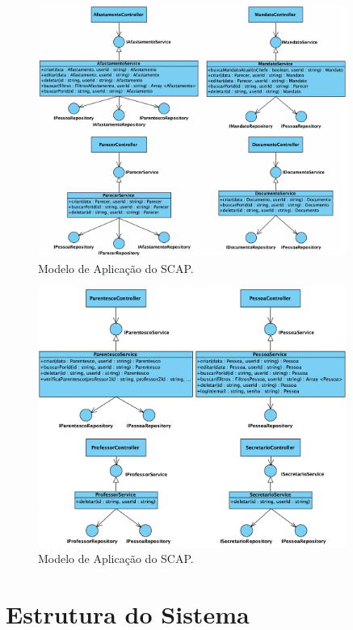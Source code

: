 \begin{figure}[h!]
    \centering
    \includegraphics[width=0.9\textwidth]{figuras/fig-modelo-apl-1.png}
    \caption{Modelo de Aplicação do SCAP.}
    \label{fig-modelo-aplicacao-1}
\end{figure}


\begin{figure}[h!]
    \centering
    \includegraphics[width=0.9\textwidth]{figuras/fig-modelo-apl-2.png}
    \caption{Modelo de Aplicação do SCAP.}
    \label{fig-modelo-aplicacao-2}
\end{figure}

\FloatBarrier


\section{Estrutura do Sistema}
\label{sec-projeto-estrutura}

